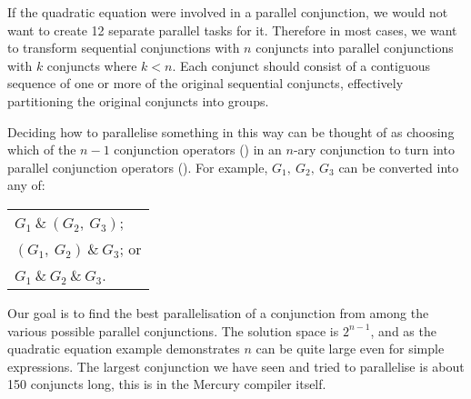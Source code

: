 \noindent
If the quadratic equation were involved in a parallel conjunction,
we would not want to create 12 separate parallel tasks for it.
Therefore in most cases,
we want to transform sequential conjunctions with $n$ conjuncts into
parallel conjunctions with $k$ conjuncts where $k < n$.
Each conjunct should consist of a contiguous sequence
of one or more of the original sequential conjuncts,
effectively partitioning the original conjuncts into groups.

Deciding how to parallelise something in this way can be thought of as
choosing which of the $n-1$ conjunction operators (\samp{,}) in an $n$-ary
conjunction to turn into parallel conjunction operators (\samp{\&}).
For example, $G_1,~G_2,~G_3$ can be converted
into any of:

\begin{tabular}{l}
$G_1~\&~(G_2,~G_3)$; \\
$(G_1,~G_2)~\&~G_3$; or \\
$G_1~\&~G_2~\&~G_3$.
\end{tabular}

%

\noindent
Our goal is to find the best parallelisation of a conjunction from among
the various possible parallel conjunctions.
The solution space is $2^{n-1}$,
and as the quadratic equation example demonstrates $n$ can be quite large
even for simple expressions.
The largest conjunction we have seen and tried to parallelise is about 150
conjuncts long,
this is in the Mercury compiler itself.

